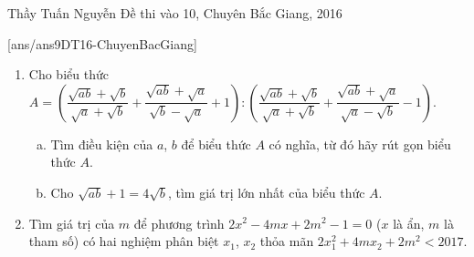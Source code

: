 \begin{name}
{Thầy  Tuấn Nguyễn}
{Đề thi vào 10, Chuyên Bắc Giang, 2016}
\end{name}
\setcounter{ex}{0}
[ans/ans9DT16-ChuyenBacGiang]
\setlength{\belowdisplayskip}{1pt}
\setlength{\abovedisplayskip}{1pt}
\begin{ex}%
\hfill
\begin{enumerate}[1)]
\item Cho biểu thức $A=\left(\dfrac{\sqrt{ab}+\sqrt{b}}{\sqrt{a}+\sqrt{b}}+\dfrac{\sqrt{ab}+\sqrt{a}}{\sqrt{b}-\sqrt{a}}+1\right):\left(\dfrac{\sqrt{ab}+\sqrt{b}}{\sqrt{a}+\sqrt{b}}+\dfrac{\sqrt{ab}+\sqrt{a}}{\sqrt{a}-\sqrt{b}}-1\right)$.
		\begin{enumerate}[a)]
		\item Tìm điều kiện của $a$, $b$ để biểu thức $A$ có nghĩa, từ đó hãy rút gọn biểu thức $A$.
		\item Cho $\sqrt{ab}+1=4\sqrt{b}$, tìm giá trị lớn nhất của biểu thức $A$.
		\end{enumerate}
\item Tìm giá trị của $m$ để phương trình $2x^2-4mx+2m^2-1=0$ ($x$ là ẩn, $m$ là tham số) có hai nghiệm phân biệt $x_1$, $x_2$ thỏa mãn $2x_1^2+4mx_2+2m^2<2017$.
\end{enumerate}
\end{ex}
